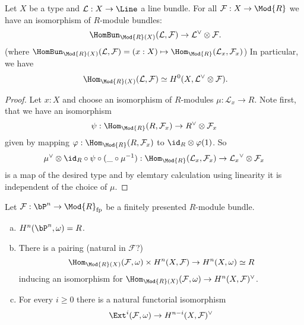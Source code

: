 
\begin{lemma}
  \label{bundle-homs-to-dual-tensor}
  Let $X$ be a type and $\mathcal L:X\to \Line$ a line bundle.
  For all $\mathcal F:X\to\Mod{R}$ we have an isomorphism of $R$-module bundles:
  \[ \HomBun_{\Mod{R}(X)}(\mathcal L,\mathcal F) \to \mathcal L^{\vee} \otimes \mathcal F\rlap{.}\]
  (where $\HomBun_{\Mod{R}(X)}(\mathcal L,\mathcal F)= (x:X) \mapsto \Hom_{\Mod{R}}(\mathcal L_x,\mathcal F_x)$)
  In particular, we have
  \[\Hom_{\Mod{R}(X)}(\mathcal L,\mathcal F) \simeq H^0(X,\mathcal L^{\vee} \otimes \mathcal F)\rlap{.} \]
\end{lemma}

\begin{proof}
  Let $x:X$ and choose an isomorphism of $R$-modules $\mu:\mathcal L_x\to R$.
  Note first, that we have an isomorphism
  \[ \psi: \Hom_{\Mod{R}}(R,\mathcal F_x) \to R^{\vee}\otimes \mathcal F_x\]
  given by mapping $\varphi:\Hom_{\Mod{R}}(R,\mathcal F_x)$ to $\id_R\otimes \varphi(1)$.
  So
  \[ \mu^{\vee}\otimes \id_R \circ \psi\circ (\_\circ \mu^{-1})
  : \Hom_{\Mod{R}}(\mathcal L_x,\mathcal F_x) \to {\mathcal L_x}^{\vee}\otimes \mathcal F_x\]
  is a map of the desired type and by elemtary calculation using linearity it is independent of the choice of $\mu$.
\end{proof}


\begin{theorem}
  Let $\mathcal F:\bP^n\to\Mod{R}_{\mathrm{fp}}$ be a finitely presented $R$-module bundle.
  \begin{enumerate}[(a)]
  \item $H^n(\bP^n,\omega)=R$.
  \item There is a pairing (natural in $\mathcal F$?)
    \[ \Hom_{\Mod{R}(X)}(\mathcal F,\omega) \times H^n(X,\mathcal F) \to H^n(X,\omega) \simeq R \]
    inducing an isomorphism for $\Hom_{\Mod{R}(X)}(\mathcal F,\omega) \to H^n(X,\mathcal F)^\vee$.
  \item {} For every $i\geq 0$ there is a natural functorial isomorphism
    \[\Ext^i(\mathcal F,\omega) \to H^{n-i}(X,\mathcal F)^\vee \]
  \end{enumerate}
\end{theorem}

